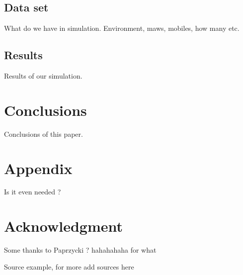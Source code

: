 \documentclass[conference]{IEEEtran}
\begin{document}








\subsection{Data set}
What do we have in simulation. Environment, maws, mobiles, how many etc.









\subsection{Results}
Results of our simulation.








\section{Conclusions}
Conclusions of this paper.











\balance




\section*{Appendix}
Is it even needed ?

\section*{Acknowledgment}
Some thanks to Paprzycki ? hahahahaha for what


\begin{thebibliography}{99}

Source example, for more add sources here

\end{thebibliography}
\end{document}
